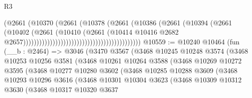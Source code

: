 \begin{lexlean}{R3}
\begin{coremodule}
                                                                (@2661
                                                                  (@10370
                                                                    (@2661
                                                                      (@10378
                                                                        (@2661
                                                                          (@10386
                                                                            (@2661
                                                                              (@10394
                                                                                (@2661
                                                                                  (@10402
                                                                                    (@2661
                                                                                      (@10410
                                                                                        (@2661
                                                                                          (@10414
                                                                                            @10416
                                                                                            @2682
                                                                                            @2657))))))))))))))))))))))))))))))))))))))))))))
@10559 := @10240
    @10464
    (fun (__b : @2464) =>
    @3046
      (@3470
        @3567
        (@3468
          @10245
          @10248
          @3574
          (@3468
            @10253
            @10256
            @3581
            (@3468
              @10261
              @10264
              @3588
              (@3468
                @10269
                @10272
                @3595
                (@3468
                  @10277
                  @10280
                  @3602
                  (@3468
                    @10285
                    @10288
                    @3609
                    (@3468
                      @10293
                      @10296
                      @3616
                      (@3468
                        @10301
                        @10304
                        @3623
                        (@3468
                          @10309
                          @10312
                          @3630
                          (@3468
                            @10317
                            @10320
                            @3637

\end{coremodule}
\end{lexlean}
